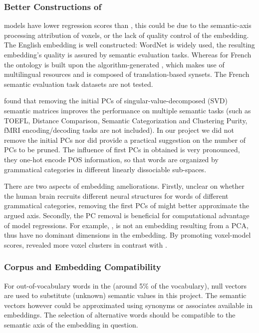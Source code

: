 \subsubsection{Better Constructions of }

 models have lower regression scores than , this could be due to the semantic-axis processing attribution of voxels, or the lack of quality control of the  embedding. The English  embedding is well constructed: WordNet is widely used, the resulting embedding's quality is assured by semantic evaluation tasks.  Whereas for French the ontology is built upon the algorithm-generated , which makes use of multilingual resources and is composed of translation-based synsets. The French semantic evaluation task datasets are not tested.  

\textcite{bullinariaExtractingSemanticRepresentations2012} found that removing the initial PCs of singular-value-decomposed (SVD) semantic matrices improves the performance on multiple semantic tasks (such as TOEFL, Distance Comparison, Semantic Categorization and Clustering Purity, fMRI encoding/decoding tasks are not included). In our project we did not remove the initial PCs nor did \citeauthor{bullinariaExtractingSemanticRepresentations2012} provide a practical suggestion on the number of PCs to be pruned. The influence of first PCs in obtained  is very pronounced, they one-hot encode POS information, so that words are organized by grammatical categories in different linearly dissociable sub-spaces. 

There are two aspects of  embedding ameliorations. Firstly, unclear on whether the human brain recruits different neural structures for words of different grammatical categories, removing the first PCs of  might better approximate the argued \similarity axis. Secondly, the PC removal is beneficial for computational advantage of model regressions. For example, , is not an embedding resulting from a PCA, thus have no dominant dimensions in the embedding. By promoting voxel-model scores,  revealed more voxel clusters in contrast with . 

\subsubsection{Corpus and Embedding Compatibility}

For out-of-vocabulary words in the  (around 5\% of the vocabulary), null vectors are used to substitute (unknown) semantic values in this project. The semantic vectors however could be approximated using synonyms or associates available in embeddings. The selection of alternative words should be compatible to the semantic axis of the embedding in question.

